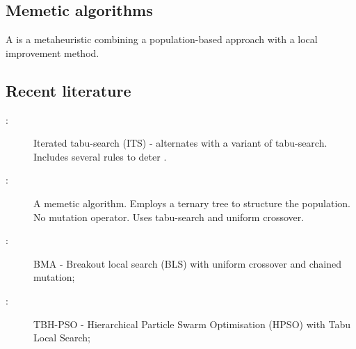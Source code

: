 \subsection{Memetic algorithms} {
    A  \citep{Neri:2012jr} is a metaheuristic combining a population-based approach with a local improvement method.
}

\subsection{Recent literature} {
    \begin{description}
        \item[\citep{Misevicius:2012dj}:] Iterated tabu-search (ITS) - alternates  with a variant of tabu-search. Includes several rules to deter .
        \item[\citep{Harris:2015kw}:] A memetic algorithm. Employs a ternary tree to structure the population. No mutation operator. Uses tabu-search and uniform crossover.
        \item[\citep{Benlic:2015gp}:] BMA - Breakout local search (BLS) with uniform crossover and chained mutation;
        \item[\citep{Helal:2015de}:] TBH-PSO - Hierarchical Particle Swarm Optimisation (HPSO) with Tabu Local Search;
    \end{description}
}

